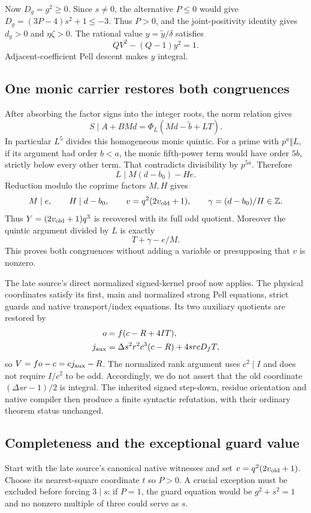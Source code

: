 Now $D_g=g^2\ge0$. Since $s\ne0$, the alternative $P\le0$ would give
$D_g=(3P-4)s^2+1\le-3$. Thus $P>0$, and the joint-positivity identity
gives $d_g>0$ and $\eta\zeta>0$.
The rational value $y=\widetilde y/\delta$ satisfies
\[
 QV^2-(Q-1)y^2=1.
\]
Adjacent-coefficient Pell descent makes $y$ integral.

\subsection{One monic carrier restores both congruences}
After absorbing the factor signs into the integer roots, the norm relation
gives
\[
 S\mid A+BMd=\Phi_L(Md-\widetilde b+LT).
\]
In particular $L^5$ divides this homogeneous monic quintic.
For a prime with $p^a\Vert L$, if its argument had order $b<a$,
the monic fifth-power term would have order $5b$, strictly below every
other term. That contradicts divisibility by $p^{5a}$. Therefore
\[
 L\mid M(d-b_0)-He.
\]
Reduction modulo the coprime factors $M,H$ gives
\[
 M\mid e,\qquad H\mid d-b_0,
 \qquad v=q^2(2v_{\rm old}+1),\qquad
 \gamma=(d-b_0)/H\in\mathbb Z.
\]
Thus $Y=(2v_{\rm old}+1)q^3$ is recovered with its full odd quotient.
Moreover the quintic argument divided by $L$ is exactly
\[
 T+\gamma-e/M.
\]
This proves both congruences without adding a variable or presupposing
that $v$ is nonzero.

The late source's direct normalized signed-kernel proof now applies.
The physical coordinates satisfy its first, main and normalized strong
Pell equations, strict guards and native transport/index equations.
Its two auxiliary quotients are restored by
\begin{align*}
 o&=f(c-R+4IT),\\
 j_{\rm aux}&=\Delta s^2r^2c^3(c-R)+4srcD_fT,
\end{align*}
so $V=fo-c=cj_{\rm aux}-R$. The normalized rank argument uses
$c^2\mid I$ and does not require $I/c^2$ to be odd. Accordingly, we do
not assert that the old coordinate $(\Delta sr-1)/2$ is integral.
The inherited signed step-down, residue orientation and native compiler
then produce a finite syntactic refutation, with their ordinary theorem
status unchanged.

\subsection{Completeness and the exceptional guard value}
Start with the late source's canonical native witnesses and set
$v=q^2(2v_{\rm old}+1)$. Choose its nearest-square coordinate $t$ so
$P>0$. A crucial exception must be excluded before forcing $3\mid s$:
if $P=1$, the guard equation would be $g^2+s^2=1$ and no nonzero
multiple of three could serve as $s$.

